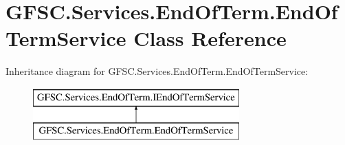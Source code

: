\hypertarget{class_g_f_s_c_1_1_services_1_1_end_of_term_1_1_end_of_term_service}{}\section{G\+F\+S\+C.\+Services.\+End\+Of\+Term.\+End\+Of\+Term\+Service Class Reference}
\label{class_g_f_s_c_1_1_services_1_1_end_of_term_1_1_end_of_term_service}
Inheritance diagram for G\+F\+S\+C.\+Services.\+End\+Of\+Term.\+End\+Of\+Term\+Service\+:\begin{figure}[H]
\begin{center}
\leavevmode
\includegraphics[height=2.000000cm]{class_g_f_s_c_1_1_services_1_1_end_of_term_1_1_end_of_term_service}
\end{center}
\end{figure}
